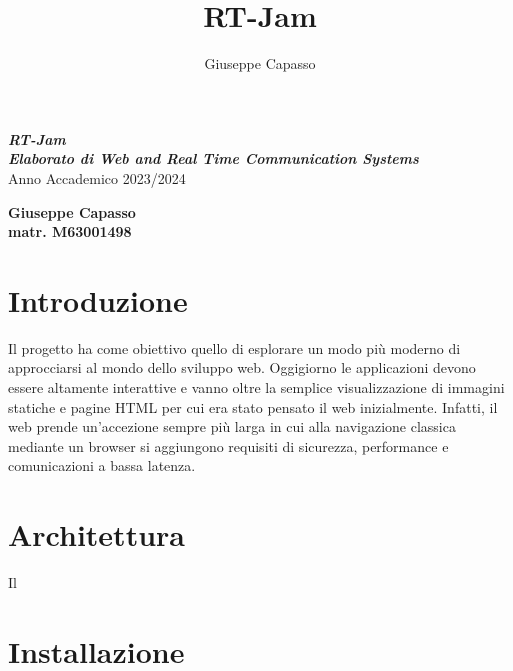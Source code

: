 \documentclass{article}
\title{RT-Jam}
\author{Giuseppe Capasso}
\begin{document}
\begin{titlepage}
  \thispagestyle{empty}
  \raggedright %


  \vfill

  {\textbf{\textit{\LARGE RT-Jam}}}
  \\[2cm]

  {\textbf{\textit{\Large Elaborato di Web and Real Time Communication Systems}}}
  \\[1cm]
  {\large Anno Accademico 2023/2024}

  \vfill

  \begin{table}[h]
    \textbf{Giuseppe Capasso}
    \\
    \textbf{matr. M63001498}
  \end{table}

\end{titlepage}

\tableofcontents
\newpage

\section*{Introduzione}
Il progetto ha come obiettivo quello di esplorare un modo più moderno di approcciarsi al 
mondo dello sviluppo web.  Oggigiorno le applicazioni devono essere altamente interattive e
vanno oltre la semplice visualizzazione di immagini statiche e pagine HTML per cui era stato
pensato il web inizialmente. Infatti, il web prende un'accezione sempre più larga
in cui alla navigazione classica mediante un browser si aggiungono requisiti di sicurezza,
performance e comunicazioni a bassa latenza. 

\clearpage
\section{Architettura}
Il 
\clearpage

\clearpage
\section{Installazione}
\clearpage




\end{document}
